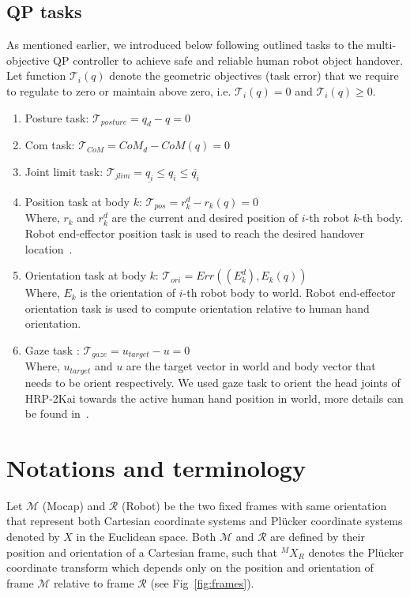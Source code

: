 \subsection{QP tasks}\label{QPTasks}
As mentioned earlier, we introduced below following outlined tasks to the multi-objective QP controller to achieve safe and reliable human robot object handover. Let function $\mathscr{T}_i(q)$ denote the geometric objectives (task error) that we require to regulate to zero or maintain above zero, i.e. $\mathscr{T}_i(q) = 0$ and $\mathscr{T}_i(q) \geq 0$.  

\begin{enumerate}[start=1,label={\bf\arabic*.}]

\item Posture task: $\mathscr{T}_{posture} = q_d - q = 0$  

\item Com task: $\mathscr{T}_{CoM} = CoM_d - CoM(q) = 0$

\item Joint limit task: $\mathscr{T}_{jlim} = \underline{q_i} \leq q_i \leq \overline{q_i}$  

\item Position task at body $k$: $\mathscr{T}_{pos} = r^d_k - r_k(q) = 0$\\
Where, $r_k$ and $r^d_k$ are the current and desired position of $i$-th robot $k$-th body. Robot end-effector position task is used to reach the desired handover location~\cite{ladder-HRP-2Kai}.

\item Orientation task at body $k$: $\mathscr{T}_{ori} = Err((E^d_k),  E_k(q))$\\
Where, $E_k$ is the orientation of $i$-th robot body to world. Robot end-effector orientation task is used to compute orientation relative to human hand orientation.

\item Gaze task : $\mathscr{T}_{gaze} =u_{target} - u = 0$\\
Where, $u_{target}$  and $u$ are the target vector in world and body vector that needs to be orient respectively. We used gaze task to orient the head joints of HRP-2Kai towards the active human hand position in world, more details can be found in~\cite{samy2017VecOriTask}.

\end{enumerate}


\clearpage

\section{Notations and terminology}
Let $\mathcal{M}$ (Mocap) and $\mathcal{R}$ (Robot) be the two fixed frames with same orientation that represent both Cartesian coordinate systems and Pl\"ucker coordinate systems denoted by $X$ in the Euclidean space. Both $\mathcal{M}$ and $\mathcal{R}$ are defined by their position and orientation of a Cartesian frame, such that ${}^MX_R$ denotes the Pl\"ucker coordinate transform which depends only on the position and orientation of frame $\mathcal{M}$ relative to frame $\mathcal{R}$ (see Fig~\ref{fig:frames}).

